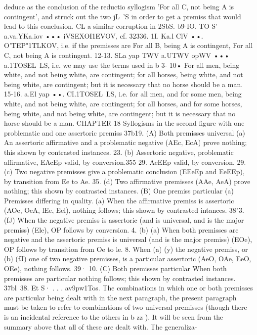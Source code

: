 {{{{{{{{{deduce as the conclusion of the reductio syllogism 'For all C,
not being A is contingent', and struck out the two jL~'S in order
to get a premiss that would lead to this conclusion. CL a similar
corruption in 2SbS.
b9-IO. TO S' a.va.YKa.iov ••• iVSEXOI1EVOV, cf. 32336.
1I. Ka.l ClV ••. O'TEP"1TLKOV, i.e. if the premisses are For all B,
being A is contingent, For all C, not being A is contingent.
12-13. SLa yap TWV a.UTWV opWV ••• a.1TOSEL~LS, i.e. we may use
the terms used in b 3- 10• For all men, being white, and not being
white, are contingent; for all horses, being white, and not being
white, are contingent; but it is necessary that no horse should be
a man.
15-16. a.El yap ••. CI.1TOSEL~LS, i.e. for all men, and for some
men, being white, and not being white, are contingent; for all
horses, and for some horses, being white, and not being white, are
contingent; but it is necessary that no horse should be a man.
CHAPTER 18
Syllogisms in the second figure with one problematic and one assertoric
premiss
37b19.
(A) Both premisses universal
(a) An assertoric affirmative and a problematic negative (AEc,
EcA) prove nothing; this shown by contrasted instances.
23. (b) Assertoric negative, problematic affirmative, EAcEp
valid, by conversion.355
29. AeEEp valid, by conversion.
29. (c) Two negative premisses give a problematic conclusion
(EEeEp and EeEEp), by transition from Ee to Ae.
35. (d) Two affirmative premisses (AAe, AeA) prove nothing;
this shown by contrasted instances.
(B) One premiss particular
(a) Premisses differing in quality. (a) When the affirmative
premiss is assertoric (AOe, OeA, lEe, Eel), nothing follows; this
shown by contrasted intances.
38"3. (fJ) When the negative premiss is assertoric (and is
universal, and is the major premiss) (Ele), OP follows by conversion.
4. (b) (a) When both premisses are negative and the assertoric
premiss is universal (and is the major premiss) (EOe), OP follows
by transition from Oe to le.
8. When (a) (y) the negative premiss, or (b) (fJ) one of two
negative premisses, is a particular assertoric (AeO, OAe, EeO,
OEe), nothing follows.
39·
10.
(C) Both premisses particular
When both premisses are particular nothing follows; this shown
by contrasted instances.
37bl~38. Et S· . . . av9pw1Tos. The combinations in which
one or both premisses are particular being dealt with in the next
paragraph, the present paragraph must be taken to refer to
combinations of two universal premisses (though there is an
incidental reference to the others in b zz ). It will be seen from the
summary above that all of these are dealt with. The generaliza-
}}}}}}}}}

